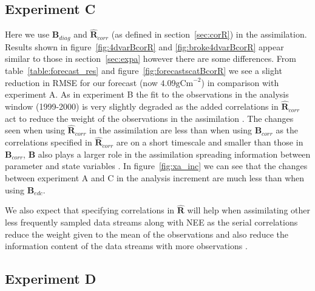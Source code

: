 \documentclass[11pt]{article}
\begin{document}

\subsection{Experiment C} \label{sec:expc}

Here we use $\textbf{B}_{diag}$ and $\hat{\textbf{R}}_{corr}$ (as defined in section~\ref{sec:corR}) in the assimilation. Results shown in figure~\ref{fig:4dvarBcorR} and \ref{fig:broke4dvarBcorR} appear similar to those in section~\ref{sec:expa} however there are some differences. From table~\ref{table:forecast_res} and figure~\ref{fig:forecastscatBcorR} we see a slight reduction in RMSE for our forecast (now $4.09 \text{gCm}^{-2}$) in comparison with experiment A. As in experiment B the fit to the observations in the analysis window (1999-2000) is very slightly degraded as the added correlations in $\hat{\textbf{R}}_{corr}$ act to reduce the weight of the observations in the assimilation \citep{jarvinen1999variational}. The changes seen when using $\hat{\textbf{R}}_{corr}$ in the assimilation are less than when using $\textbf{B}_{corr}$ as the correlations specified in $\hat{\textbf{R}}_{corr}$ are on a short timescale and smaller than those in $\textbf{B}_{corr}$, $\textbf{B}$ also plays a larger role in the assimilation spreading information between parameter and state variables \citep{bannister2008review}. In figure~\ref{fig:xa_inc} we can see that the changes between experiment A and C in the analysis increment are much less than when using $\textbf{B}_{edc}$.  

We also expect that specifying correlations in $\hat{\textbf{R}}$ will help when assimilating other less frequently sampled data streams along with NEE as the serial correlations reduce the weight given to the mean of the observations and also reduce the information content of the data streams with more observations \citep{jarvinen1999variational, Daley1992}.

\subsection{Experiment D}
\end{document}
